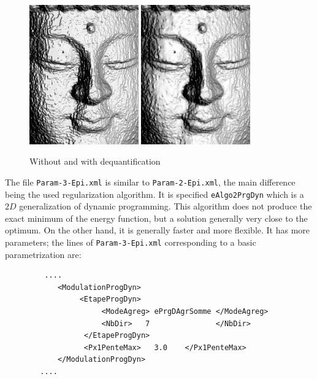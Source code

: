 \begin{figure}
\begin{center}
\includegraphics[height=60mm]{FIGS/Boudhas/ShadeQuant.jpg}
\includegraphics[height=60mm]{FIGS/Boudhas/ShadeDeQuant.jpg}
\caption{Without and with dequantification}
\label{FIG:DISP:REGUL}
\end{center}
\end{figure}


The file {\tt Param-3-Epi.xml} is similar to {\tt Param-2-Epi.xml}, the
main difference being the used regularization algorithm. It is specified
{\tt eAlgo2PrgDyn} which is a $2D$ generalization of dynamic programming.
This algorithm does not produce the exact minimum of the energy function,
but a solution generally very close to the optimum. On the other hand,
it is generally faster and more flexible. It has more parameters;
the lines of {\tt Param-3-Epi.xml} corresponding to a basic
parametrization are:

{\scriptsize
\begin{verbatim}
         ....
            <ModulationProgDyn>
                 <EtapeProgDyn>
                      <ModeAgreg> ePrgDAgrSomme </ModeAgreg>
                      <NbDir>   7               </NbDir>
                  </EtapeProgDyn>
                  <Px1PenteMax>   3.0    </Px1PenteMax>
            </ModulationProgDyn>
        ....

\end{verbatim}
}


